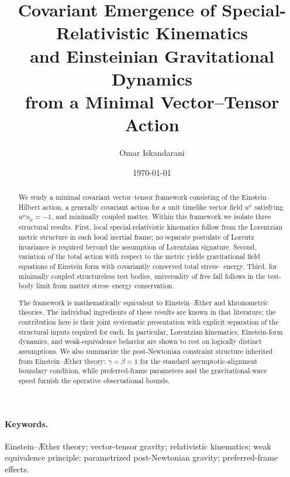 \documentclass[12pt,a4paper]{article}
\title{Covariant Emergence of Special-Relativistic Kinematics\\
and Einsteinian Gravitational Dynamics\\
from a Minimal Vector--Tensor Action}
\author[1]{Omar Iskandarani}
\affil[1]{Independent Researcher, Groningen, The Netherlands\\
\texttt{info@omariskandarani.com}\quad ORCID: 0009-0006-1686-3961}
\date{\today}
\newcommand{\AEther}{\AE{}ther}
\begin{document}
    \maketitle
    
    \begin{abstract}
        We study a minimal covariant vector--tensor framework consisting of the
        Einstein--Hilbert action, a generally covariant action for a unit timelike
        vector field $u^{\mu}$ satisfying $u^{\mu}u_{\mu}=-1$, and minimally coupled
        matter. Within this framework we isolate three structural results. First,
        local special-relativistic kinematics follow from the Lorentzian metric
        structure in each local inertial frame; no separate postulate of Lorentz
        invariance is required beyond the assumption of Lorentzian signature. Second,
        variation of the total action with respect to the metric yields gravitational
        field equations of Einstein form with covariantly conserved total stress--
        energy. Third, for minimally coupled structureless test bodies, universality
        of free fall follows in the test-body limit from matter stress--energy
        conservation.
        
        The framework is mathematically equivalent to Einstein--\AEther{} and
        khronometric theories. The individual ingredients of these results are known in
        that literature; the contribution here is their joint systematic presentation
        with explicit separation of the structural inputs required for each. In
        particular, Lorentzian kinematics, Einstein-form dynamics, and weak-equivalence
        behavior are shown to rest on logically distinct assumptions. We also summarize
        the post-Newtonian constraint structure inherited from Einstein--\AEther{}
        theory: $\gamma=\beta=1$ for the standard asymptotic-alignment boundary
        condition, while preferred-frame parameters and the gravitational-wave speed
        furnish the operative observational bounds.
    \end{abstract}
    
    
    \paragraph{Keywords.}
        Einstein--\AEther{} theory; vector-tensor gravity; relativistic kinematics; weak equivalence principle; parametrized post-Newtonian gravity; preferred-frame effects.
\end{document}
